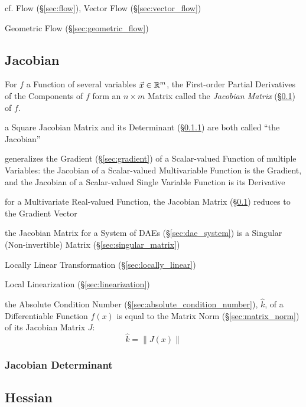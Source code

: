 {cf. Flow (\S\ref{sec:flow}), Vector Flow (\S\ref{sec:vector_flow})

Geometric Flow (\S\ref{sec:geometric_flow})



\subsection{Jacobian}\label{sec:jacobian}

For $f$ a Function of several variables $\vec{x} \in \mathbb{R}^m$, the First-order
Partial Derivatives of the Components of $f$ form an $n \times m$ Matrix called
the \emph{Jacobian Matrix} (\S\ref{sec:jacobian}) of $f$.

a Square Jacobian Matrix and its Determinant (\S\ref{sec:jacobian_determinant})
are both called ``the Jacobian''

generalizes the Gradient (\S\ref{sec:gradient}) of a Scalar-valued Function of
multiple Variables: the Jacobian of a Scalar-valued Multivariable Function is
the Gradient, and the Jacobian of a Scalar-valued Single Variable Function is
its Derivative

for a Multivariate Real-valued Function, the Jacobian Matrix
(\S\ref{sec:jacobian}) reduces to the Gradient Vector

\fist the Jacobian Matrix for a System of DAEs (\S\ref{sec:dae_system}) is
a Singular (Non-invertible) Matrix (\S\ref{sec:singular_matrix})

\fist Locally Linear Transformation (\S\ref{sec:locally_linear})

\fist Local Linearization (\S\ref{sec:linearization})

the Absolute Condition Number (\S\ref{sec:absolute_condition_number}),
$\hat{k}$, of a Differentiable Function $f(x)$ is equal to the Matrix Norm
(\S\ref{sec:matrix_norm}) of its Jacobian Matrix $J$:
\[
  \hat{k} = \|J(x)\|
\]



\subsubsection{Jacobian Determinant}\label{sec:jacobian_determinant}



\subsection{Hessian}\label{sec:hessian}

}
